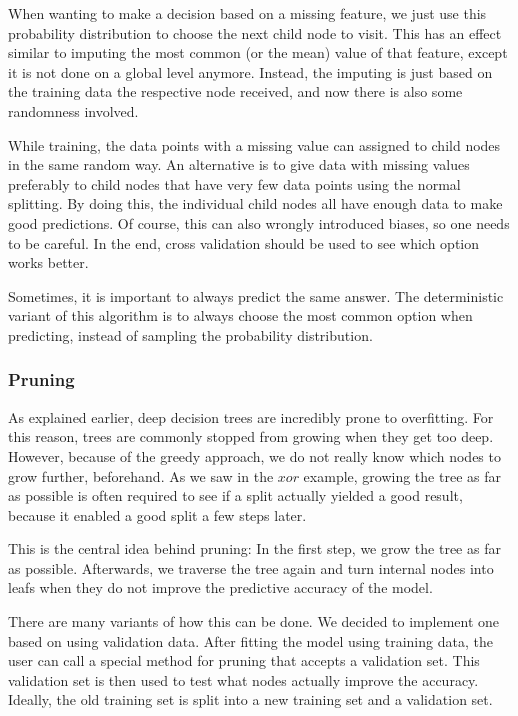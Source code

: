 \documentclass[a4paper]{article}
\begin{document}
When wanting to make a decision based on a missing feature, we just use this probability distribution to choose the next child node to visit. This has an effect similar to imputing the most common (or the mean) value of that feature, except it is not done on a global level anymore. Instead, the imputing is just based on the training data the respective node received, and now there is also some randomness involved.

While training, the data points with a missing value can assigned to child nodes in the same random way. An alternative is to give data with missing values preferably to child nodes that have very few data points using the normal splitting. By doing this, the individual child nodes all have enough data to make good predictions. Of course, this can also wrongly introduced biases, so one needs to be careful. In the end, cross validation should be used to see which option works better.

Sometimes, it is important to always predict the same answer. The deterministic variant of this algorithm is to always choose the most common option when predicting, instead of sampling the probability distribution.

\subsubsection{Pruning}
\label{subsec:c45-pruning}

As explained earlier, deep decision trees are incredibly prone to overfitting. For this reason, trees are commonly stopped from growing when they get too deep. However, because of the greedy approach, we do not really know which nodes to grow further, beforehand. As we saw in the $\mathit{xor}$ example, growing the tree as far as possible is often required to see if a split actually yielded a good result, because it enabled a good split a few steps later.

This is the central idea behind pruning: In the first step, we grow the tree as far as possible. Afterwards, we traverse the tree again and turn internal nodes into leafs when they do not improve the predictive accuracy of the model.

There are many variants of how this can be done. We decided to implement one based on using validation data. After fitting the model using training data, the user can call a special method for pruning that accepts a validation set. This validation set is then used to test what nodes actually improve the accuracy. Ideally, the old training set is split into a new training set and a validation set.
\end{document}
